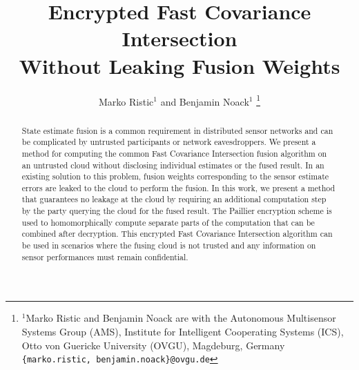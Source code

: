 \documentclass[letterpaper, 10 pt, conference]{ieeeconf}
\title{\LARGE \bf
Encrypted Fast Covariance Intersection\\Without Leaking Fusion Weights
}
\author{Marko Ristic$^{1}$ and Benjamin Noack$^{1}$%
\thanks{$^{1}$Marko Ristic and Benjamin Noack are with the Autonomous Multisensor Systems Group (AMS), Institute for Intelligent Cooperating Systems (ICS), Otto von Guericke University (OVGU), Magdeburg, Germany {\tt\small \{marko.ristic, benjamin.noack\}@ovgu.de}}%
}
\begin{document}
\maketitle
\thispagestyle{empty}
\pagestyle{empty}

% 
%                                    
%                                    
%                                    
% 
\begin{abstract}
    State estimate fusion is a common requirement in distributed sensor networks and can be complicated by untrusted participants or network eavesdroppers. We present a method for computing the common Fast Covariance Intersection fusion algorithm on an untrusted cloud without disclosing individual estimates or the fused result. In an existing solution to this problem, fusion weights corresponding to the sensor estimate errors are leaked to the cloud to perform the fusion. In this work, we present a method that guarantees no leakage at the cloud by requiring an additional computation step by the party querying the cloud for the fused result. The Paillier encryption scheme is used to homomorphically compute separate parts of the computation that can be combined after decryption. This encrypted Fast Covariance Intersection algorithm can be used in scenarios where the fusing cloud is not trusted and any information on sensor performances must remain confidential.
\end{abstract}


% 
%                                                        
%                                                        
%                                                        
% 
\end{document}
